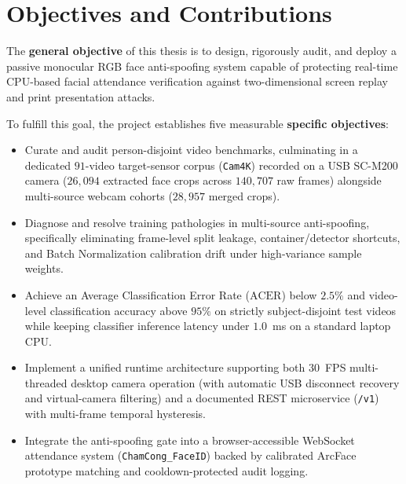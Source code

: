 \section{Objectives and Contributions}
\label{sec:objectives_contributions}

The \textbf{general objective} of this thesis is to design, rigorously audit, and deploy a passive monocular RGB face anti-spoofing system capable of protecting real-time CPU-based facial attendance verification against two-dimensional screen replay and print presentation attacks.

To fulfill this goal, the project establishes five measurable \textbf{specific objectives}:
\begin{itemize}
    \item Curate and audit person-disjoint video benchmarks, culminating in a dedicated $91$-video target-sensor corpus (\texttt{Cam4K}) recorded on a USB SC-M200 camera ($26{,}094$ extracted face crops across $140{,}707$ raw frames) alongside multi-source webcam cohorts ($28{,}957$ merged crops).
    \item Diagnose and resolve training pathologies in multi-source anti-spoofing, specifically eliminating frame-level split leakage, container/detector shortcuts, and Batch Normalization calibration drift under high-variance sample weights.
    \item Achieve an Average Classification Error Rate ($\text{ACER}$) below $2.5\%$ and video-level classification accuracy above $95\%$ on strictly subject-disjoint test videos while keeping classifier inference latency under $1.0$~ms on a standard laptop CPU.
    \item Implement a unified runtime architecture supporting both $30$~FPS multi-threaded desktop camera operation (with automatic USB disconnect recovery and virtual-camera filtering) and a documented REST microservice (\texttt{/v1}) with multi-frame temporal hysteresis.
    \item Integrate the anti-spoofing gate into a browser-accessible WebSocket attendance system (\texttt{ChamCong\_FaceID}) backed by calibrated ArcFace prototype matching and cooldown-protected audit logging.
\end{itemize}

